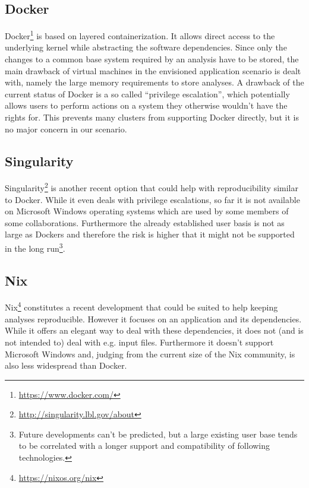\documentclass[a4paper, twoside, 11pt]{article}
\begin{document}
\subsection{Docker}
Docker\footnote{\url{https://www.docker.com/}} is based on layered containerization. It allows direct access 
to the underlying kernel while abstracting the software dependencies. 
Since only the changes to a common base system required by an analysis have to be stored, 
the main drawback of virtual machines in the envisioned application scenario is dealt with, 
namely the large memory requirements to store analyses. 
A drawback of the current status of Docker is a so called ``privilege escalation'', 
which potentially allows users to perform actions on a system they otherwise wouldn't have the rights for. 
This prevents many clusters from supporting Docker directly, but it is no major concern in our scenario. 


\subsection{Singularity}
Singularity\footnote{\url{http://singularity.lbl.gov/about}} is another recent
option that could help with reproducibility similar to Docker. 
While it even deals with privilege escalations, 
so far it is not available on Microsoft Windows operating systems which are used by some members of some collaborations. 
Furthermore the already established user basis is not as large as Dockers 
and therefore the risk is higher that it might not be supported 
in the long run\footnote{Future developments can't be predicted, but a large existing user base tends to be 
correlated with a longer support and compatibility of following technologies.}. 


\subsection{Nix}
Nix\footnote{\url{https://nixos.org/nix}} constitutes a recent development that could be suited to help keeping analyses reproducible. 
However it focuses on an application and its dependencies. 
While it offers an elegant way to deal with these dependencies, it does not (and is not intended to) deal with e.g. input files. 
Furthermore it doesn't support Microsoft Windows and, 
judging from the current size of the Nix community, is also less widespread than Docker. 
\end{document}
